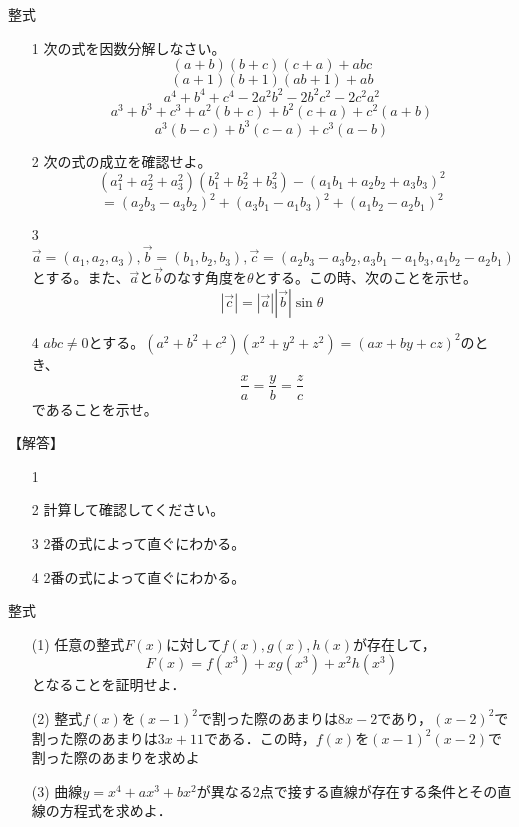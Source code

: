 \documentclass[a4paper,fleqn,dvipdfmx]{jsarticle}
\begin{document}
\newpage
\begin{itembox}[l]{整式}
    \begin{itemize}
        \item [1]
        次の式を因数分解しなさい。
        $$(a+b)(b+c)(c+a)+abc$$
        $$(a+1)(b+1)(ab+1)+ab$$
        $$a^4+b^4+c^4-2a^2b^2-2b^2c^2-2c^2a^2$$
        $$a^3+b^3+c^3+a^2(b+c)+b^2(c+a)+c^2(a+b)$$
        $$a^3(b-c)+b^3(c-a)+c^3(a-b)$$
        \item [2]
        次の式の成立を確認せよ。
        $$(a_1^2+a_2^2+a_3^2)(b_1^2+b_2^2+b_3^2)-(a_1b_1+a_2b_2+a_3b_3)^2$$
        $$=(a_2b_3-a_3b_2)^2+(a_3b_1-a_1b_3)^2+(a_1b_2-a_2b_1)^2$$
        \item [3] 
        $\overrightarrow{a}=(a_1,a_2,a_3),\overrightarrow{b}=(b_1,b_2,b_3),\overrightarrow{c}=(a_2b_3-a_3b_2,a_3b_1-a_1b_3,a_1b_2-a_2b_1)$とする。また、$\overrightarrow{a}$と$\overrightarrow{b}$のなす角度を$\theta$とする。この時、次のことを示せ。
        $$|\overrightarrow{c}|=|\overrightarrow{a}||\overrightarrow{b}|\sin\theta$$
        \item [4]
        $abc\neq 0$とする。$(a^2+b^2+c^2)(x^2+y^2+z^2)=(ax+by+cz)^2$のとき、$$\frac{x}{a}=\frac{y}{b}=\frac{z}{c}$$
        であることを示せ。
    \end{itemize}
\end{itembox}

\begin{flushleft}
【解答】\dotfill
\end{flushleft}

\begin{itemize}
    \item [1]
    \item [2]計算して確認してください。
    \item [3]2番の式によって直ぐにわかる。
    \item [4]2番の式によって直ぐにわかる。
\end{itemize}
\dotfill

\newpage
\begin{itembox}[l]{整式}
\begin{itemize}
    \item [(1)] 
    任意の整式$F(x)$に対して$f(x),g(x),h(x)$が存在して，    $$F(x)=f(x^3)+xg(x^3)+x^2h(x^3)$$    となることを証明せよ．
    \item[(2)]
    整式$f(x)$を$(x-1)^2$で割った際のあまりは$8x-2$であり，$(x-2)^2$で割った際のあまりは$3x+11$である．この時，$f(x)$を$(x-1)^2(x-2)$で割った際のあまりを求めよ
    \item[(3)]
    曲線$y=x^4+ax^3+bx^2$が異なる2点で接する直線が存在する条件とその直線の方程式を求めよ．
\end{itemize}
\end{itembox}
\end{document}
